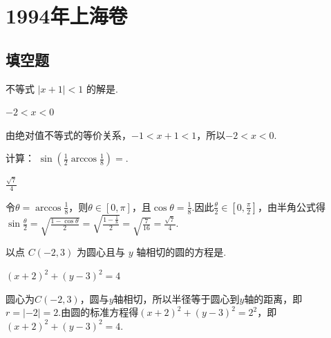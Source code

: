 \documentclass[UTF8,a4paper,oneside,11pt]{ctexbook}
\begin{document}
\mainmatter

\chapter{1994年上海卷}
\section{填空题}

\begin{problem}
不等式 \(|x + 1| < 1\) 的解是\fillinblank{}.
\end{problem}

\begin{answer}
\(-2 < x < 0\)
\end{answer}

\begin{solution}
由绝对值不等式的等价关系，\(-1 < x + 1 < 1\)，所以\(-2 < x < 0\).
\end{solution}

\begin{problem}
计算： \(\sin \left(\frac{1}{2} \arccos \frac{1}{8}\right) =\)\fillinblank{}.
\end{problem}

\begin{answer}
\(\frac{\sqrt{7}}{4}\)
\end{answer}

\begin{solution}
令\(\theta=\arccos\frac{1}{8}\)，则\(\theta\in[0,\pi]\)，且\(\cos\theta=\frac{1}{8}\).因此\(\frac{\theta}{2}\in[0,\frac{\pi}{2}]\)，由半角公式得
\(\sin\frac{\theta}{2}=\sqrt{\frac{1-\cos\theta}{2}}=\sqrt{\frac{1-\frac{1}{8}}{2}}=\sqrt{\frac{7}{16}}=\frac{\sqrt{7}}{4}\).
\end{solution}

\begin{problem}
以点 \(C(-2,3)\) 为圆心且与 \(y\) 轴相切的圆的方程是\fillinblank{}.
\end{problem}

\begin{answer}
\((x + 2)^2 + (y - 3)^2 = 4\)
\end{answer}

\begin{solution}
圆心为\(C(-2,3)\)，圆与\(y\)轴相切，所以半径等于圆心到\(y\)轴的距离，即\(r=|-2|=2\).由圆的标准方程得\((x+2)^2+(y-3)^2=2^2\)，即\((x+2)^2+(y-3)^2=4\).
\end{solution}
\end{document}
